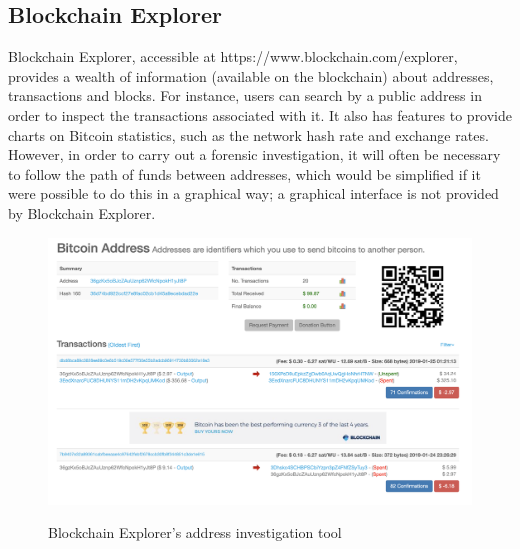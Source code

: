 \subsection{Blockchain Explorer}\label{background:blockchain-explorer}
Blockchain Explorer, accessible at https://www.blockchain.com/explorer, provides a wealth of information (available on the blockchain) about addresses, transactions and blocks. For instance, users can search by a public address in order to inspect the transactions associated with it. It also has features to provide charts on Bitcoin statistics, such as the network hash rate and exchange rates. However, in order to carry out a forensic investigation, it will often be necessary to follow the path of funds between addresses, which would be simplified if it were possible to do this in a graphical way; a graphical interface is not provided by Blockchain Explorer.

\begin{figure}[h!]
  \centering
  \includegraphics[width = 15cm]{./figures/chainanalysis}\\[0.5cm] 
  \caption{Blockchain Explorer's address investigation tool \protect \footnotemark}
\end{figure}

